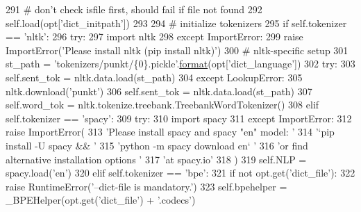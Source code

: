 \begin{DoxyCode}
291                 \textcolor{comment}{# don't check isfile first, should fail if file not found}
292                 self.load(opt[\textcolor{stringliteral}{'dict\_initpath'}])
293 
294         \textcolor{comment}{# initialize tokenizers}
295         \textcolor{keywordflow}{if} self.tokenizer == \textcolor{stringliteral}{'nltk'}:
296             \textcolor{keywordflow}{try}:
297                 \textcolor{keyword}{import} nltk
298             \textcolor{keywordflow}{except} ImportError:
299                 \textcolor{keywordflow}{raise} ImportError(\textcolor{stringliteral}{'Please install nltk (pip install nltk)'})
300             \textcolor{comment}{# nltk-specific setup}
301             st\_path = \textcolor{stringliteral}{'tokenizers/punkt/\{0\}.pickle'}.\hyperlink{namespaceparlai_1_1chat__service_1_1services_1_1messenger_1_1shared__utils_a32e2e2022b824fbaf80c747160b52a76}{format}(opt[\textcolor{stringliteral}{'dict\_language'}])
302             \textcolor{keywordflow}{try}:
303                 self.sent\_tok = nltk.data.load(st\_path)
304             \textcolor{keywordflow}{except} LookupError:
305                 nltk.download(\textcolor{stringliteral}{'punkt'})
306                 self.sent\_tok = nltk.data.load(st\_path)
307             self.word\_tok = nltk.tokenize.treebank.TreebankWordTokenizer()
308         \textcolor{keywordflow}{elif} self.tokenizer == \textcolor{stringliteral}{'spacy'}:
309             \textcolor{keywordflow}{try}:
310                 \textcolor{keyword}{import} spacy
311             \textcolor{keywordflow}{except} ImportError:
312                 \textcolor{keywordflow}{raise} ImportError(
313                     \textcolor{stringliteral}{'Please install spacy and spacy "en" model: '}
314                     \textcolor{stringliteral}{'`pip install -U spacy && '}
315                     \textcolor{stringliteral}{'python -m spacy download en` '}
316                     \textcolor{stringliteral}{'or find alternative installation options '}
317                     \textcolor{stringliteral}{'at spacy.io'}
318                 )
319             self.NLP = spacy.load(\textcolor{stringliteral}{'en'})
320         \textcolor{keywordflow}{elif} self.tokenizer == \textcolor{stringliteral}{'bpe'}:
321             \textcolor{keywordflow}{if} \textcolor{keywordflow}{not} opt.get(\textcolor{stringliteral}{'dict\_file'}):
322                 \textcolor{keywordflow}{raise} RuntimeError(\textcolor{stringliteral}{'--dict-file is mandatory.'})
323             self.bpehelper = \_BPEHelper(opt.get(\textcolor{stringliteral}{'dict\_file'}) + \textcolor{stringliteral}{'.codecs'})

\end{DoxyCode}
